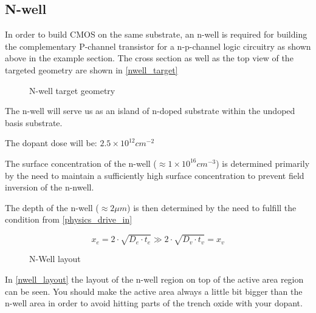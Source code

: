 \subsection{N-well}\label{nwell_chapter}
In order to build CMOS on the same substrate, an n-well is required for building the complementary P-channel transistor for a n-p-channel logic circuitry as shown above in the example section.
The cross section as well as the top view of the targeted geometry are shown in \autoref{nwell_target}
\begin{figure}[H]
	\centering
	\begin{tikzpicture}[node distance = 3cm, auto, thick,scale=\CrossAndTopSectionBig, every node/.style={transform shape}]
		
	\end{tikzpicture}
	\begin{tikzpicture}[node distance = 3cm, auto, thick,scale=\CrossAndTopSectionBig, every node/.style={transform shape}]
		
	\end{tikzpicture}
	\caption{N-well target geometry}
	\label{nwell_target}
\end{figure}

The n-well will serve us as an island of n-doped substrate within the undoped basis substrate.

The dopant dose will be: $2.5\times10^{12}cm^{-2}$

The surface concentration of the n-well ($\approx 1 \times 10^{16} cm^{-3}$) is determined primarily by the need to maintain a sufficiently high surface concentration to prevent field inversion of the n-nwell.

The depth of the n-well ($\approx 2 \mu m$) is then determined by the need  to fulfill the condition from \autoref{physics_drive_in}

\begin{equation}
x_e = 2 \cdot \sqrt{D_e \cdot t_e} \gg 2 \cdot \sqrt{D_v \cdot t_v} = x_v
\end{equation}

\begin{figure}[H]
	\centering
	\begin{tikzpicture}[node distance =1cm, auto, thick,scale=\VLSILayout, every node/.style={transform shape}]
		
	\end{tikzpicture}
	\caption{N-Well layout}
	\label{nwell_layout}
\end{figure}

In \autoref{nwell_layout} the layout of the n-well region on top of the active area region can be seen.
You should make the active area always a little bit bigger than the n-well area in order to avoid hitting parts of the trench oxide with your dopant.

